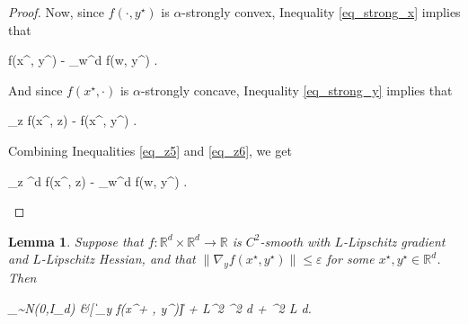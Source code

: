 \documentclass[11pt,letterpaper]{article}
\renewcommand{\epsilon}{\varepsilon}
\newtheorem{lemma}[theorem]{Lemma}
\def \be{\begin{equs}}
\def \ee{\end{equs}}
\begin{document}
\begin{proof}
\noindent
Now, since $f(\cdot, y^\star)$ is $\alpha$-strongly convex, Inequality \eqref{eq_strong_x} implies that
\be \label{eq_z5}
f(x^\star, y^\star) - \min_{w\in {}^d} f(w, y^\star) \frac{\epsilon^2}{\alpha}.
\ee
%
And since $f(x^\star, \cdot)$ is  $\alpha$-strongly concave, 
%
Inequality \eqref{eq_strong_y} implies that
\be \label{eq_z6}
\max_{z\in {}} f(x^\star, z) - f(x^\star, y^\star) \leq \frac{\epsilon^2}{\alpha}.
\ee

\noindent
Combining Inequalities \eqref{eq_z5} and \eqref{eq_z6}, we get
%
\be \label{eq_z8}
\max_{z \in {}^d} f(x^\star, z) - \min_{w\in {}^d} f(w, y^\star) \frac{\epsilon^2}{\alpha}.
\ee

\end{proof}

\begin{lemma} \label{lemma_strong}
Suppose that $f: \mathbb{R}^d \times \mathbb{R}^d \rightarrow \mathbb{R}$ is $C^2$-smooth with $L$-Lipschitz gradient and $L$-Lipschitz Hessian, and that $\|\nabla_y f(x^\star, y^\star)\| \leq \epsilon$ for some $x^\star, y^\star \in \mathbb{R}^d$.  Then
\be
{}_{\zeta \sim N(0,I_d)} &[ \|\nabla_y f(x^\star  + \sigma \zeta, y^\star)\|] \leq \epsilon + \frac{1}{2 \epsilon}L^2  \sigma^2 d  +   \sigma^2 L d.
\ee

\end{lemma}
\end{document}
